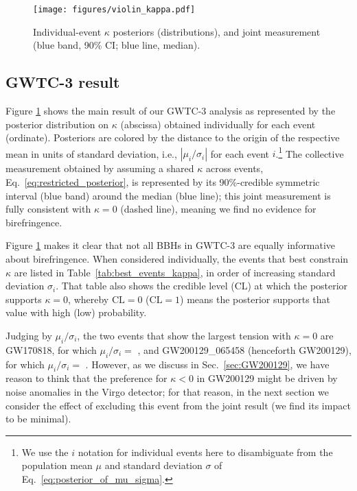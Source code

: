 \documentclass[aps,prd,twocolumn,superscriptaddress,preprintnumbers,floatfix,nofootinbib]{revtex4-2}
\begin{document}
\begin{figure}
    \texttt{[image: figures/violin\_kappa.pdf]}
    \caption{
        Individual-event $\kappa$ posteriors (distributions), and joint measurement (blue band, 90\% CI; blue line, median).
    }
    \label{fig:violin_kappa}
\end{figure}

\subsection{GWTC-3 result}

Figure \ref{fig:violin_kappa} shows the main result of our GWTC-3 analysis as represented by the posterior distribution on $\kappa$ (abscissa) obtained individually for each event (ordinate).
Posteriors are colored by the distance to the origin of the respective mean in units of standard deviation, i.e., $|\mu_i/\sigma_i|$ for each event $i$.\footnote{We use the $i$ notation for individual events here to disambiguate from the population mean $\mu$ and standard deviation $\sigma$ of Eq.~\eqref{eq:posterior_of_mu_sigma}.}
The collective measurement obtained by assuming a shared $\kappa$ across events, Eq.~\eqref{eq:restricted_posterior}, is represented by its 90\%-credible symmetric interval (blue band) around the median (blue line); this joint measurement is fully consistent with $\kappa = 0$ (dashed line), meaning we find no evidence for birefringence.

Figure \ref{fig:violin_kappa} makes it clear that not all \acp{BBH} in GWTC-3 are equally informative about birefringence.
When considered individually, the events that best constrain $\kappa$ are listed in Table~\ref{tab:best_events_kappa}, in order of increasing standard deviation $\sigma_i$.
That table also shows the credible level (CL) at which the posterior supports $\kappa = 0$, whereby $\mathrm{CL} = 0$ ($\mathrm{CL} = 1$) means the posterior supports that value with high (low) probability.

Judging by $\mu_i/\sigma_i$, the two events that show the largest tension with $\kappa = 0$ are GW170818, for which $\mu_i / \sigma_i =$ , and GW200129\_065458 (henceforth GW200129), for which $\mu_i / \sigma_i =$ .
However, as we discuss in Sec.~\ref{sec:GW200129}, we have reason to think that the preference for $\kappa < 0$ in GW200129 might be driven by noise anomalies in the Virgo detector; for that reason, in the next section we consider the effect of excluding this event from the joint result (we find its impact to be minimal).
\end{document}
